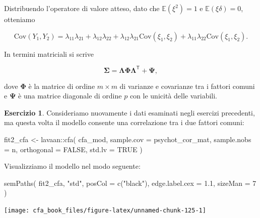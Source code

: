 \documentclass[
  11pt,
]{krantz}
\makeatletter
\newenvironment{Shaded}{\begin{snugshade}}{\end{snugshade}}
\newcommand{\AttributeTok}[1]{\textcolor[rgb]{0.61,0.61,0.61}{#1}}
\newcommand{\ConstantTok}[1]{\textcolor[rgb]{0,0,0}{#1}}
\newcommand{\DecValTok}[1]{\textcolor[rgb]{0.06,0.06,0.06}{#1}}
\newcommand{\FloatTok}[1]{\textcolor[rgb]{0.06,0.06,0.06}{#1}}
\newcommand{\FunctionTok}[1]{\textcolor[rgb]{0,0,0}{#1}}
\newcommand{\NormalTok}[1]{#1}
\newcommand{\OtherTok}[1]{\textcolor[rgb]{0.37,0.37,0.37}{#1}}
\newcommand{\SpecialCharTok}[1]{\textcolor[rgb]{0,0,0}{#1}}
\newcommand{\StringTok}[1]{\textcolor[rgb]{0.5,0.5,0.5}{#1}}
\newenvironment{kframe}{%
\medskip{}
\setlength{\fboxsep}{.8em}
 \def\at@end@of@kframe{}%
 \ifinner\ifhmode%
  \def\at@end@of@kframe{\end{minipage}}%
  \begin{minipage}{\columnwidth}%
 \fi\fi%
 \def\FrameCommand##1{\hskip\@totalleftmargin \hskip-\fboxsep
 \colorbox{shadecolor}{##1}\hskip-\fboxsep
     \hskip-\linewidth \hskip-\@totalleftmargin \hskip\columnwidth}%
 \MakeFramed {\advance\hsize-\width
   \@totalleftmargin\z@ \linewidth\hsize
   \@setminipage}}%
 {\par\unskip\endMakeFramed%
 \at@end@of@kframe}
\renewenvironment{Shaded}{\begin{kframe}}{\end{kframe}}
\newcommand{\E}{\mathbb{E}} %
\theoremstyle{definition}
\theoremstyle{definition}
\theoremstyle{definition}
\newtheorem{exercise}{Esercizio}[chapter]
\theoremstyle{definition}
\theoremstyle{remark}
\makeatother
\begin{document}
Distribuendo l'operatore di valore atteso, dato che \(\E(\xi^2)=1\) e \(\E(\xi \delta)=0\), otteniamo

\[
\mbox{Cov}(Y_1, Y_2) = \lambda_{11} \lambda_{21} + \lambda_{12} \lambda_{22} + 
\lambda_{12} \lambda_{21}\mbox{Cov}(\xi_1, \xi_2) +\lambda_{11} \lambda_{22}\mbox{Cov}(\xi_1, \xi_2).
\]

In termini matriciali si scrive

\[
\boldsymbol{\Sigma} =\boldsymbol{\Lambda} \boldsymbol{\Phi} \boldsymbol{\Lambda}^{\mathsf{T}} + \boldsymbol{\Psi}, 
\]

dove \(\boldsymbol{\Phi}\) è la matrice di ordine \(m \times m\) di varianze e covarianze tra i fattori comuni e \(\boldsymbol{\Psi}\) è una matrice diagonale di ordine \(p\) con le unicità delle variabili.

\begin{exercise}

Consideriamo nuovamente i dati esaminati negli esercizi precedenti, ma questa volta il modello consente una correlazione tra i due fattori comuni:

\begin{Shaded}
\begin{Highlighting}[]
\NormalTok{fit2\_cfa }\OtherTok{\textless{}{-}}\NormalTok{ lavaan}\SpecialCharTok{::}\FunctionTok{cfa}\NormalTok{(}
\NormalTok{  cfa\_mod,}
  \AttributeTok{sample.cov =}\NormalTok{ psychot\_cor\_mat,}
  \AttributeTok{sample.nobs =}\NormalTok{ n,}
  \AttributeTok{orthogonal =} \ConstantTok{FALSE}\NormalTok{,}
  \AttributeTok{std.lv =} \ConstantTok{TRUE}
\NormalTok{)}
\end{Highlighting}
\end{Shaded}

Visualizziamo il modello nel modo seguente:

\begin{Shaded}
\begin{Highlighting}[]
\FunctionTok{semPaths}\NormalTok{(}
\NormalTok{  fit2\_cfa,}
  \StringTok{"std"}\NormalTok{,}
  \AttributeTok{posCol =} \FunctionTok{c}\NormalTok{(}\StringTok{"black"}\NormalTok{),}
  \AttributeTok{edge.label.cex =} \FloatTok{1.1}\NormalTok{,}
  \AttributeTok{sizeMan =} \DecValTok{7}
\NormalTok{)}
\end{Highlighting}
\end{Shaded}

\begin{center}\texttt{[image: cfa\_book\_files/figure-latex/unnamed-chunk-125-1]} \end{center}


\end{exercise}
\end{document}
